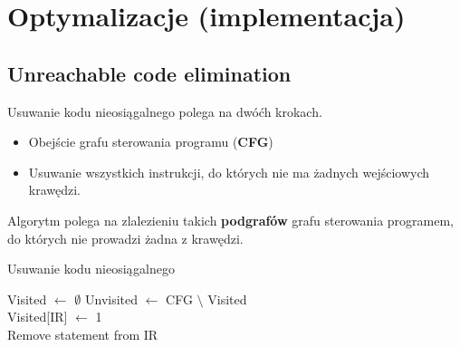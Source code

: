 \section{Optymalizacje (implementacja)}
	\subsection{Unreachable code elimination}
	
		Usuwanie kodu nieosiągalnego polega na dwóćh krokach.
		\begin{itemize}
			\item Obejście grafu sterowania programu (\textbf{CFG})
			\item Usuwanie wszystkich instrukcji, do których nie ma żadnych wejściowych krawędzi.
		\end{itemize}
		
		\spacing

		Algorytm polega na zlalezieniu takich \textbf{podgrafów} grafu sterowania programem, do których
		nie prowadzi żadna z krawędzi.

		\begin{algorithm}
			\caption{Usuwanie kodu nieosiągalnego}
			\begin{algorithmic}[1]
					\State Visited $\gets$ $\emptyset$
					\State {}
					\State Unvisited $\gets$ CFG $\setminus$ Visited
					\State {}
				\EndProcedure
				\\
					\State Visited[IR] $\gets$ 1
						\State {}
					\EndFor
				\EndProcedure
				\\
						\State Remove statement from IR
					\EndFor
				\EndProcedure
			\end{algorithmic}
		\end{algorithm}
